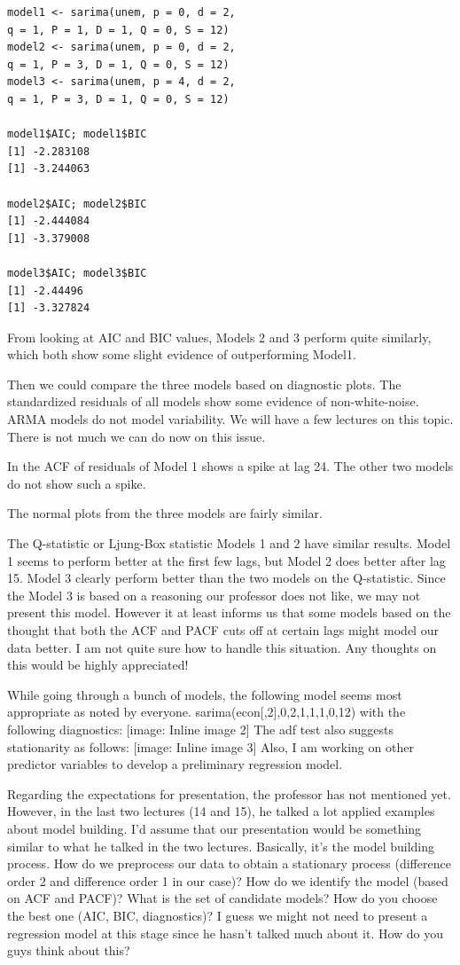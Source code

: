 \documentclass[twoside,twocolumn]{article}
\begin{document}
\begin{verbatim}
model1 <- sarima(unem, p = 0, d = 2, 
q = 1, P = 1, D = 1, Q = 0, S = 12)
model2 <- sarima(unem, p = 0, d = 2, 
q = 1, P = 3, D = 1, Q = 0, S = 12)
model3 <- sarima(unem, p = 4, d = 2, 
q = 1, P = 3, D = 1, Q = 0, S = 12)

model1$AIC; model1$BIC
[1] -2.283108
[1] -3.244063

model2$AIC; model2$BIC
[1] -2.444084
[1] -3.379008

model3$AIC; model3$BIC
[1] -2.44496
[1] -3.327824
\end{verbatim}

From looking at AIC and BIC values, Models 2 and 3 perform quite similarly, which both show some slight evidence of outperforming Model1.

Then we could compare the three models based on diagnostic plots. The standardized residuals of all models show some evidence of non-white-noise. ARMA models do not model variability. We will have a few lectures on this topic. There is not much we can do now on this issue.

In the ACF of residuals of Model 1 shows a spike at lag 24. The other two models do not show such a spike.

The normal plots from the three models are fairly similar.

The Q-statistic or Ljung-Box statistic
Models 1 and 2 have similar results. Model 1 seems to perform better at the first few lags, but Model 2 does better after lag 15. Model 3 clearly perform better than the two models on the Q-statistic. Since the Model 3 is based on a reasoning our professor does not like, we may not present this model. However it at least informs us that some models based on the thought that both the ACF and PACF cuts off at certain lags might model our data better. I am not quite sure how to handle this situation. Any thoughts on this would be highly appreciated!

While going through a bunch of models, the following model seems most appropriate as noted by everyone. sarima(econ[,2],0,2,1,1,1,0,12) with the following diagnostics: [image: Inline image 2] The adf test also suggests stationarity as follows: [image: Inline image 3] Also, I am working on other predictor variables to develop a preliminary regression model.

Regarding the expectations for presentation, the professor has not
mentioned yet. However, in the last two lectures (14 and 15), he talked a
lot applied examples about model building. I'd assume that our presentation
would be something similar to what he talked in the two lectures.
Basically, it's the model building process. How do we preprocess our data
to obtain a stationary process (difference order 2 and difference order 1
in our case)? How do we identify the model (based on ACF and PACF)? What is
the set of candidate models? How do you choose the best one (AIC, BIC,
diagnostics)? I guess we might not need to present a regression model at
this stage since he hasn't talked much about it. How do you guys think
about this?
\end{document}
